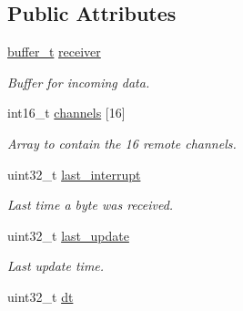 \subsection*{Public Attributes}
\begin{DoxyCompactItemize}
\item 
\hypertarget{structspektrum__satellite__t_ad07e959bdd45b06f9e0535e3527d5751}{\hyperlink{structbuffer__t}{buffer\+\_\+t} \hyperlink{structspektrum__satellite__t_ad07e959bdd45b06f9e0535e3527d5751}{receiver}}\label{structspektrum__satellite__t_ad07e959bdd45b06f9e0535e3527d5751}

\begin{DoxyCompactList}\small\item\em Buffer for incoming data. \end{DoxyCompactList}\item 
\hypertarget{structspektrum__satellite__t_a867ae7c35ce5acfcd3c972ac8d984b81}{int16\+\_\+t \hyperlink{structspektrum__satellite__t_a867ae7c35ce5acfcd3c972ac8d984b81}{channels} \mbox{[}16\mbox{]}}\label{structspektrum__satellite__t_a867ae7c35ce5acfcd3c972ac8d984b81}

\begin{DoxyCompactList}\small\item\em Array to contain the 16 remote channels. \end{DoxyCompactList}\item 
\hypertarget{structspektrum__satellite__t_a0ad77b1503688e377db75b879cd88784}{uint32\+\_\+t \hyperlink{structspektrum__satellite__t_a0ad77b1503688e377db75b879cd88784}{last\+\_\+interrupt}}\label{structspektrum__satellite__t_a0ad77b1503688e377db75b879cd88784}

\begin{DoxyCompactList}\small\item\em Last time a byte was received. \end{DoxyCompactList}\item 
\hypertarget{structspektrum__satellite__t_a2a948d8b44c21a0b1da10246e1728f6c}{uint32\+\_\+t \hyperlink{structspektrum__satellite__t_a2a948d8b44c21a0b1da10246e1728f6c}{last\+\_\+update}}\label{structspektrum__satellite__t_a2a948d8b44c21a0b1da10246e1728f6c}

\begin{DoxyCompactList}\small\item\em Last update time. \end{DoxyCompactList}\item 
\hypertarget{structspektrum__satellite__t_afc742249a4effe6f3f6ad6e498143d57}{uint32\+\_\+t \hyperlink{structspektrum__satellite__t_afc742249a4effe6f3f6ad6e498143d57}{dt}}\label{structspektrum__satellite__t_afc742249a4effe6f3f6ad6e498143d57}


\end{DoxyCompactItemize}

